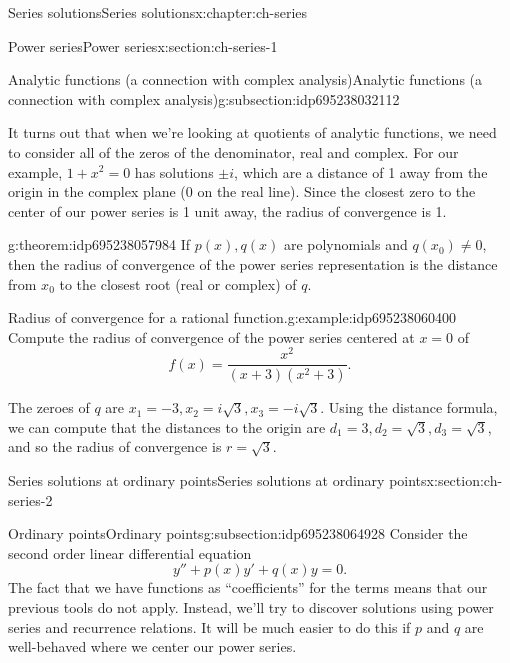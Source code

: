 \documentclass[oneside,10pt,]{book}
\numberwithin{equation}{section}
\numberwithin{equation}{section}
\begin{document}
\begin{chapterptx}{Series solutions}{}{Series solutions}{}{}{x:chapter:ch-series}
\begin{sectionptx}{Power series}{}{Power series}{}{}{x:section:ch-series-1}
\begin{subsectionptx}{Analytic functions (a connection with complex analysis)}{}{Analytic functions (a connection with complex analysis)}{}{}{g:subsection:idp695238032112}
\par
It turns out that when we're looking at quotients of analytic functions, we need to consider all of the zeros of the denominator, real and complex. For our example, \(1 + x^2 = 0\) has solutions \(\pm i\), which are a distance of 1 away from the origin in the complex plane (0 on the real line). Since the closest zero to the center of our power series is 1 unit away, the radius of convergence is 1.%
\begin{theorem}{}{}{g:theorem:idp695238057984}%
If \(p(x), q(x)\) are polynomials and \(q(x_0) \neq 0\), then the radius of convergence of the power series representation is the distance from \(x_0\) to the closest root (real or complex) of \(q\).%
\end{theorem}
\begin{example}{Radius of convergence for a rational function.}{g:example:idp695238060400}%
Compute the radius of convergence of the power series centered at \(x = 0\) of%
\begin{equation*}
f(x) = \frac{x^2}{(x +3)(x^2 + 3)}.
\end{equation*}
%
\par
The zeroes of \(q\) are \(x_1= -3, x_2 = i\sqrt{3}, x_3 = -i\sqrt{3}\). Using the distance formula, we can compute that the distances to the origin are \(d_1 = 3, d_2 = \sqrt{3}, d_3 = \sqrt{3}\), and so the radius of convergence is \(r = \sqrt{3}\).%
\end{example}
\end{subsectionptx}
\end{sectionptx}
%
%
\typeout{************************************************}
\typeout{************************************************}
%
\begin{sectionptx}{Series solutions at ordinary points}{}{Series solutions at ordinary points}{}{}{x:section:ch-series-2}
%
%
\typeout{************************************************}
\typeout{************************************************}
%
\begin{subsectionptx}{Ordinary points}{}{Ordinary points}{}{}{g:subsection:idp695238064928}
Consider the second order linear differential equation%
\begin{equation*}
y'' + p(x) y' + q(x) y = 0.
\end{equation*}
The fact that we have functions as ``coefficients'' for the terms means that our previous tools do not apply. Instead, we'll try to discover solutions using power series and recurrence relations. It will be much easier to do this if \(p\) and \(q\) are well-behaved where we center our power series.%

\end{subsectionptx}
\end{sectionptx}
\end{chapterptx}
\end{document}
